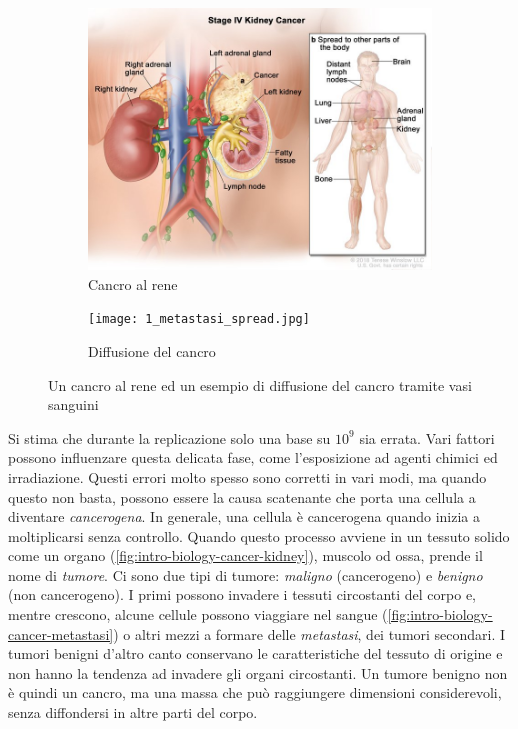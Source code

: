 \begin{figure}[h]
    \begin{subfigure}[b]{.5 \textwidth}
        \centering
        \includegraphics[width=0.75 \textwidth]{Images/1_tumor.jpg}
        \caption{\small Cancro al rene}
        \label{fig:intro-biology-cancer-kidney}
    \end{subfigure}%
    \begin{subfigure}[b]{.5 \textwidth}
        \centering
        \texttt{[image: 1\_metastasi\_spread.jpg]}
        \caption{\small Diffusione del cancro}
        \label{fig:intro-biology-cancer-metastasi}
    \end{subfigure}
    \caption{Un cancro al rene ed un esempio di diffusione del cancro tramite vasi sanguini}
\end{figure}

Si stima che durante la replicazione solo una base su $10^9$ \cite{DNAReplication} sia errata. Vari fattori possono influenzare questa delicata fase, come l'esposizione ad agenti chimici ed irradiazione. Questi errori molto spesso sono corretti in vari modi, ma quando questo non basta, possono essere la causa scatenante che porta una cellula a diventare \textit{cancerogena}. In generale, una cellula è cancerogena quando inizia a moltiplicarsi senza controllo. Quando questo processo avviene in un tessuto solido come un organo (\autoref{fig:intro-biology-cancer-kidney}), muscolo od ossa, prende il nome di \textit{tumore}. Ci sono due tipi di tumore: \textit{maligno} (cancerogeno) e \textit{benigno} (non cancerogeno). I primi possono invadere i tessuti circostanti del corpo e, mentre crescono, alcune cellule possono viaggiare nel sangue (\autoref{fig:intro-biology-cancer-metastasi}) o altri mezzi a formare delle \textit{metastasi}, dei tumori secondari. I tumori benigni d'altro canto conservano le caratteristiche del tessuto di origine e non hanno la tendenza ad invadere gli organi circostanti. Un tumore benigno non è quindi un cancro, ma una massa che può raggiungere dimensioni considerevoli, senza diffondersi in altre parti del corpo.


